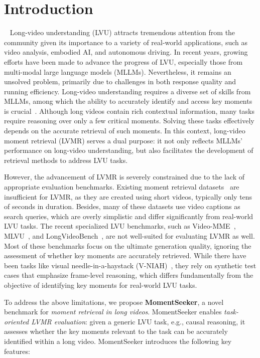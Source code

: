 \documentclass{article}
\begin{document}
\section{Introduction}~\label{sec:intro} %
Long-video understanding (LVU) attracts tremendous attention from the community given its importance to a variety of real-world applications, such as video analysis, embodied AI, and autonomous driving. In recent years, growing efforts have been made to advance the progress of LVU, especially those from multi-modal large language models (MLLMs). Nevertheless, it remains an unsolved problem, primarily due to challenges in both response quality and running efficiency. Long-video understanding requires a diverse set of skills from MLLMs, among which the ability to accurately identify and access key moments is crucial~\cite{wu2024longvideobench}. Although long videos contain rich contextual information, many tasks require reasoning over only a few critical moments. Solving these tasks effectively depends on the accurate retrieval of such moments. In this context, long-video moment retrieval (LVMR) serves a dual purpose: it not only reflects MLLMs' performance on long-video understanding, but also facilitates the development of retrieval methods to address LVU tasks.  


However, the advancement of LVMR is severely constrained due to the lack of appropriate evaluation benchmarks. Existing moment retrieval datasets~\cite{qvhighlights, gao2017charadeSTA, lei2020tvr} are insufficient for LVMR, as they are created using short videos, typically only tens of seconds in duration. Besides, many of these datasets use video captions as search queries, which are overly simplistic and differ significantly from real-world LVU tasks. The recent specialized LVU benchmarks, such as Video-MME~\cite{fu2024videomme}, MLVU~\cite{zhou2025mlvu}, and LongVideoBench~\cite{wu2024longvideobench}, are not well-suited for evaluating LVMR as well. Most of these benchmarks focus on the ultimate generation quality, ignoring the assessment of whether key moments are accurately retrieved. While there have been tasks like visual needle-in-a-haystack (V-NIAH)~\cite{zhang2024long}, they rely on synthetic test cases that emphasize frame-level reasoning, which differs fundamentally from the objective of identifying key moments for real-world LVU tasks.   


To address the above limitations, we propose \textbf{MomentSeeker}, a novel benchmark for \textit{moment retrieval in long videos}. MomentSeeker enables \textit{task-oriented LVMR evaluation}: given a generic LVU task, e.g., causal reasoning, it assesses whether the key moments relevant to the task can be accurately identified within a long video. MomentSeeker introduces the following key features: 
\end{document}
